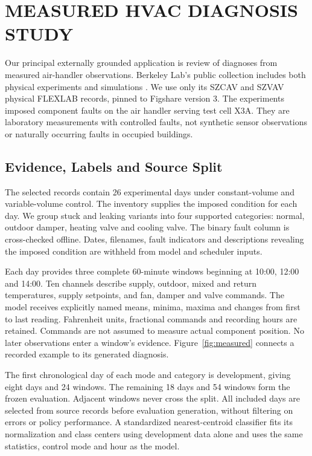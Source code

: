 \section{MEASURED HVAC DIAGNOSIS STUDY}
\noindent Our principal externally grounded application is review of diagnoses from measured air-handler observations. Berkeley Lab's public collection includes both physical experiments and simulations \cite{granderson2020data}. We use only its SZCAV and SZVAV physical FLEXLAB records, pinned to Figshare version 3. The experiments imposed component faults on the air handler serving test cell X3A. They are laboratory measurements with controlled faults, not synthetic sensor observations or naturally occurring faults in occupied buildings.\draftcredit

\subsection{Evidence, Labels and Source Split}
The selected records contain 26 experimental days under constant-volume and variable-volume control. The inventory supplies the imposed condition for each day. We group stuck and leaking variants into four supported categories: normal, outdoor damper, heating valve and cooling valve. The binary fault column is cross-checked offline. Dates, filenames, fault indicators and descriptions revealing the imposed condition are withheld from model and scheduler inputs.

Each day provides three complete 60-minute windows beginning at 10:00, 12:00 and 14:00. Ten channels describe supply, outdoor, mixed and return temperatures, supply setpoints, and fan, damper and valve commands. The model receives explicitly named means, minima, maxima and changes from first to last reading. Fahrenheit units, fractional commands and recording hours are retained. Commands are not assumed to measure actual component position. No later observations enter a window's evidence. Figure~\ref{fig:measured} connects a recorded example to its generated diagnosis.

The first chronological day of each mode and category is development, giving eight days and 24 windows. The remaining 18 days and 54 windows form the frozen evaluation. Adjacent windows never cross the split. All included days are selected from source records before evaluation generation, without filtering on errors or policy performance. A standardized nearest-centroid classifier fits its normalization and class centers using development data alone and uses the same statistics, control mode and hour as the model.


